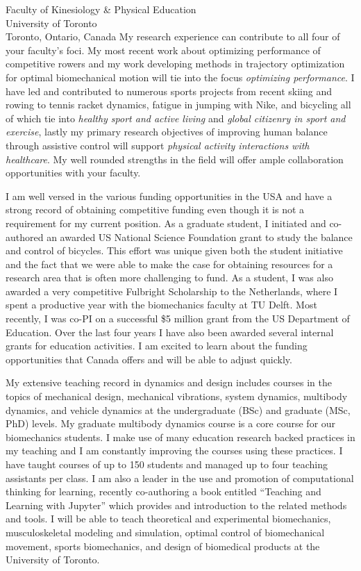 \documentclass{letter}
\begin{document}
\begin{letter}{
  Faculty of Kinesiology \& Physical Education \\
  University of Toronto \\
  Toronto, Ontario, Canada
}
My research experience can contribute to all four of your faculty's foci. My
most recent work about optimizing performance of competitive rowers and my work
developing methods in trajectory optimization for optimal biomechanical motion
will tie into the focus \emph{optimizing performance}. I have led and
contributed to numerous sports projects from recent skiing and rowing to tennis
racket dynamics, fatigue in jumping with Nike, and bicycling all of which tie
into \emph{healthy sport and active living} and \emph{global citizenry in sport
and exercise}, lastly my primary research objectives of improving human balance
through assistive control will support \emph{physical activity interactions
with healthcare}. My well rounded strengths in the field will offer ample
collaboration opportunities with your faculty.

I am well versed in the various funding opportunities in the USA and have a
strong record of obtaining competitive funding even though it is not a
requirement for my current position. As a graduate student, I initiated and
co-authored an awarded US National Science Foundation grant to study the
balance and control of bicycles. This effort was unique given both the student
initiative and the fact that we were able to make the case for obtaining
resources for a research area that is often more challenging to fund. As a
student, I was also awarded a very competitive Fulbright Scholarship to the
Netherlands, where I spent a productive year with the biomechanics faculty at
TU Delft. Most recently, I was co-PI on a successful \$5 million grant from the
US Department of Education. Over the last four years I have also been awarded
several internal grants for education activities. I am excited to learn about
the funding opportunities that Canada offers and will be able to adjust
quickly.

My extensive teaching record in dynamics and design includes courses in the
topics of mechanical design, mechanical vibrations, system dynamics, multibody
dynamics, and vehicle dynamics at the undergraduate (BSc) and graduate (MSc,
PhD) levels. My graduate multibody dynamics course is a core course for our
biomechanics students. I make use of many education research backed practices
in my teaching and I am constantly improving the courses using these practices.
I have taught courses of up to 150 students and managed up to four teaching
assistants per class. I am also a leader in the use and promotion of
computational thinking for learning, recently co-authoring a book entitled
``Teaching and Learning with Jupyter'' which provides and introduction to the
related methods and tools. I will be able to teach theoretical and experimental
biomechanics, musculoskeletal modeling and simulation, optimal control of
biomechanical movement, sports biomechanics, and design of biomedical products
at the University of Toronto.


\end{letter}
\end{document}
